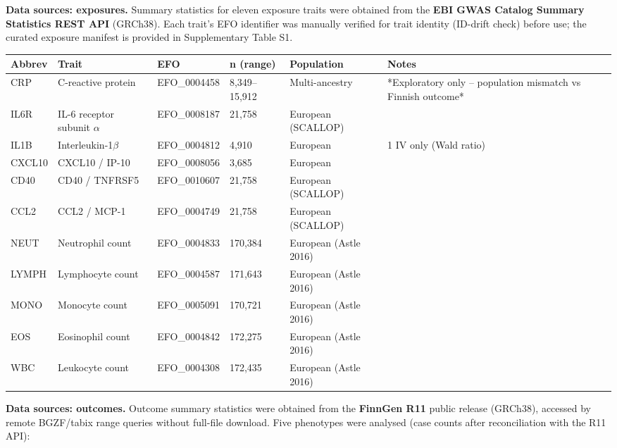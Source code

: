 \documentclass[11pt]{article}
\begin{document}
\textbf{Data sources: exposures.} Summary statistics for eleven exposure traits were obtained from the \textbf{EBI GWAS Catalog Summary Statistics REST API} (GRCh38). Each trait's EFO identifier was manually verified for trait identity (ID-drift check) before use; the curated exposure manifest is provided in Supplementary Table S1.

\begin{table}[ht]\centering
\begin{tabular}{llllll}
\toprule
Abbrev & Trait & EFO & n (range) & Population & Notes \\
\midrule
CRP & C-reactive protein & EFO\_0004458 & 8,349--15,912 & Multi-ancestry & *Exploratory only -- population mismatch vs Finnish outcome* \\
IL6R & IL-6 receptor subunit $\alpha$ & EFO\_0008187 & 21,758 & European (SCALLOP) &  \\
IL1B & Interleukin-1$\beta$ & EFO\_0004812 & 4,910 & European & 1 IV only (Wald ratio) \\
CXCL10 & CXCL10 / IP-10 & EFO\_0008056 & 3,685 & European &  \\
CD40 & CD40 / TNFRSF5 & EFO\_0010607 & 21,758 & European (SCALLOP) &  \\
CCL2 & CCL2 / MCP-1 & EFO\_0004749 & 21,758 & European (SCALLOP) &  \\
NEUT & Neutrophil count & EFO\_0004833 & 170,384 & European (Astle 2016) &  \\
LYMPH & Lymphocyte count & EFO\_0004587 & 171,643 & European (Astle 2016) &  \\
MONO & Monocyte count & EFO\_0005091 & 170,721 & European (Astle 2016) &  \\
EOS & Eosinophil count & EFO\_0004842 & 172,275 & European (Astle 2016) &  \\
WBC & Leukocyte count & EFO\_0004308 & 172,435 & European (Astle 2016) &  \\
\bottomrule
\end{tabular}
\end{table}
\textbf{Data sources: outcomes.} Outcome summary statistics were obtained from the \textbf{FinnGen R11} public release (GRCh38), accessed by remote BGZF/tabix range queries without full-file download. Five phenotypes were analysed (case counts after reconciliation with the R11 API):
\end{document}
